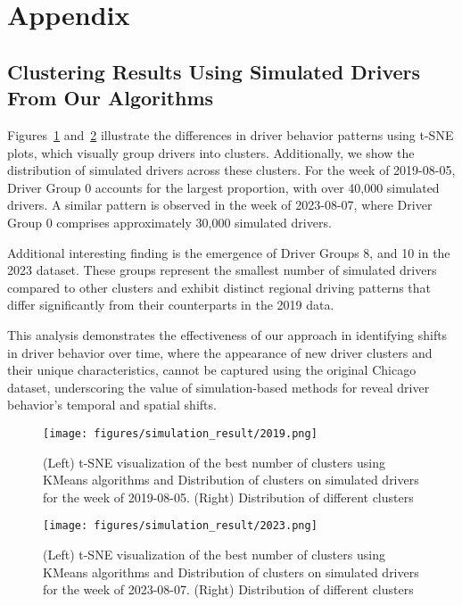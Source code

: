 \appendix
\section{Appendix}
\label{sec:appendix}
\subsection{Clustering Results Using Simulated Drivers From Our Algorithms}
Figures~\ref{figure:cluster_2019} and~\ref{figure:cluster_2023} illustrate the differences in driver behavior patterns using t-SNE plots, which visually group drivers into clusters. Additionally, we show the distribution of simulated drivers across these clusters. For the week of 2019-08-05, Driver Group 0 accounts for the largest proportion, with over 40,000 simulated drivers. A similar pattern is observed in the week of 2023-08-07, where Driver Group 0 comprises approximately 30,000 simulated drivers.

Additional interesting finding is the emergence of Driver Groups 8, and 10 in the 2023 dataset. These groups represent the smallest number of simulated drivers compared to other clusters and exhibit distinct regional driving patterns that differ significantly from their counterparts in the 2019 data.

This analysis demonstrates the effectiveness of our approach in identifying shifts in driver behavior over time, where the appearance of new driver clusters and their unique characteristics, cannot be captured using the original Chicago dataset, underscoring the value of simulation-based methods for reveal driver behavior's temporal and spatial shifts.
\begin{figure}[h]
  \centering
  \texttt{[image: figures/simulation\_result/2019.png]}
  \caption{(Left) t-SNE visualization of the best number of clusters using KMeans algorithms and Distribution of clusters on simulated drivers for the week of 2019-08-05. (Right) Distribution of different clusters}
  \label{figure:cluster_2019}
\end{figure}

\begin{figure}[h]
  \centering
  \texttt{[image: figures/simulation\_result/2023.png]}
  \caption{(Left) t-SNE visualization of the best number of clusters using KMeans algorithms and Distribution of clusters on simulated drivers for the week of 2023-08-07. (Right) Distribution of different clusters}
  \label{figure:cluster_2023}
\end{figure}

